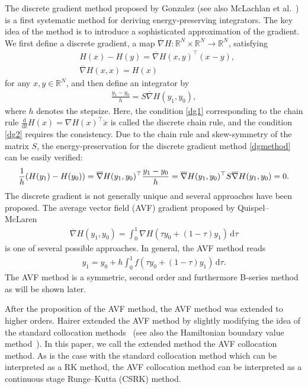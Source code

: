 \documentclass[final,leqno,onefignum,onetabnum]{siamltex1213}
\DeclarePairedDelimiter\paren{\lparen}{\rparen}
\begin{document}
The discrete gradient method proposed by Gonzalez \cite{go96}
(see also McLachlan et al.~\cite{mc99})
is a first systematic method for deriving energy-preserving integrators.
The key idea of the method is to introduce a sophisticated approximation of
the gradient.
We first define a discrete gradient,
a map $\overline{\nabla}H: {\mathbb R}^N\times{\mathbb R}^N \to {\mathbb R}^N$, satisfying
\begin{align}
& H(x) - H(y) = \overline{\nabla}H(x,y)^\top (x-y), \label{dg1} \\
& \overline{\nabla} H(x,x) = H(x) \label{dg2}
\end{align}
for any $x,y\in{\mathbb R}^N$,
and then define an integrator by
\begin{align}\label{dgmethod}
\frac{y_1-y_0}{h} = S \overline{\nabla} H(y_1,y_0),
\end{align}
where $h$ denotes the stepsize.
Here, the condition \eqref{dg1} corresponding to the chain rule
$\frac{\mathrm d}{{\mathrm d} t} H(x) = \nabla H(x)^\top \dot{x}$
is called the discrete chain rule,
and the condition \eqref{dg2} requires the consistency.
Due to the chain rule and skew-symmetry of the matrix $S$,
the energy-preservation for the discrete gradient method \eqref{dgmethod}
can be easily verified:
\begin{align*}
\frac{1}{h}\paren*{H(y_1)-H(y_0)} 
= \overline{\nabla}H(y_1,y_0)^\top \frac{y_1-y_0}{h}
= \overline{\nabla}H(y_1,y_0)^\top S \overline{\nabla}H(y_1,y_0) = 0.
\end{align*}
The discrete gradient is not generally unique
and several approaches have been proposed.
The average vector field (AVF) gradient proposed by Quispel--McLaren~\cite{qu08}
\begin{align*}
\overline{\nabla}H(y_1,y_0) = \int_0^1 \nabla H(\tau y_0 + (1-\tau)y_1) \, {\mathrm d} \tau
\end{align*}
is one of several possible approaches.
In general, the AVF method reads
\begin{align}\label{avf}
y_1 = y_0 + h\int_0^1 f(\tau y_0 + (1-\tau)y_1) \, {\mathrm d} \tau.
\end{align}
The AVF method is a symmetric, second order and furthermore B-series method
as will be shown later.

After the proposition of the AVF method,
the AVF method was extended to higher orders.
Hairer extended the AVF method
by slightly modifying the idea of the standard collocation methods~\cite{ha10}
(see also the Hamiltonian boundary value method~\cite{bru10}).
In this paper, we call the extended method the AVF collocation method.
As is the case with the standard collocation method which can be interpreted as
a RK method,
the AVF collocation method can be interpreted as
a continuous stage Runge--Kutta (CSRK) method.
\end{document}
